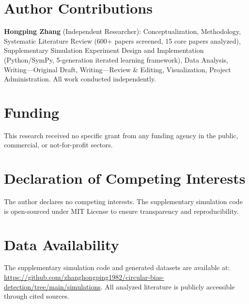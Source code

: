 \documentclass[11pt,a4paper]{article}
\begin{document}
\section*{Author Contributions}

\textbf{Hongping Zhang} (Independent Researcher): Conceptualization, Methodology, Systematic Literature Review (600+ papers screened, 15 core papers analyzed), Supplementary Simulation Experiment Design and Implementation (Python/SymPy, 5-generation iterated learning framework), Data Analysis, Writing—Original Draft, Writing—Review \& Editing, Visualization, Project Administration. All work conducted independently.

\section*{Funding}

This research received no specific grant from any funding agency in the public, commercial, or not-for-profit sectors.

\section*{Declaration of Competing Interests}

The author declares no competing interests. The supplementary simulation code is open-sourced under MIT License to ensure transparency and reproducibility.

\section*{Data Availability}

The supplementary simulation code and generated datasets are available at: \url{https://github.com/zhanghongping1982/circular-bias-detection/tree/main/simulations}. All analyzed literature is publicly accessible through cited sources.
\end{document}
